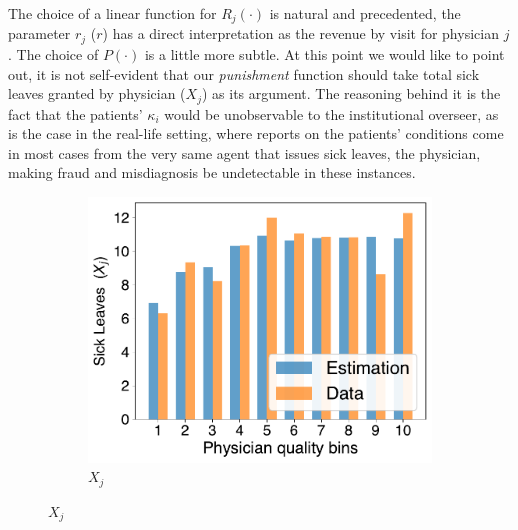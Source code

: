 \documentclass[../main.tex]{subfiles}
\begin{document}
The choice of a linear function for $R_j(\cdot)$ is natural and precedented, the parameter $r_j$ ($r$) has a direct interpretation as the revenue by visit for physician $j$. The choice of $P(\cdot)$ is a little more subtle. At this point we would like to point out, it is not self-evident that our \textit{punishment} function should take total sick leaves granted by physician ($X_j$) as its argument. The reasoning behind it is the fact that the patients' $\kappa_i$ would be unobservable to the institutional overseer, as is the case in the real-life setting, where reports on the patients' conditions come in most cases from the very same agent that issues sick leaves, the physician, making fraud and misdiagnosis be undetectable in these instances.




\begin{figure}[H]
    \centering
    \begin{subfigure}[b]{0.46\linewidth}
        \centering
        \includegraphics[width=\linewidth]{result_x.pdf}
        
        \caption{$X_j$}


\end{subfigure}
\end{figure}
\end{document}
